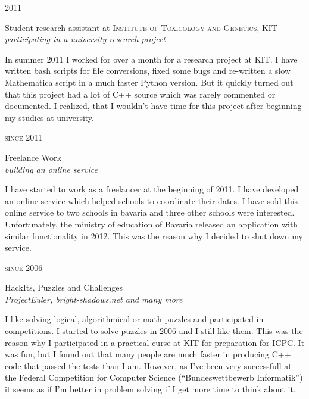 \documentclass[a4paper,10pt]{article} %
\begin{document}
{\begin{minipage}[t]{0.5\textwidth}
{\raggedleft\textsc{2011}\par}

{\raggedright\large Student research assistant at \textsc{ Institute of Toxicology and Genetics}, KIT\\
\textit{participating in a university research project}\\[5pt]}

\normalsize{In summer 2011 I worked for over a month for a
research project at KIT. I have written bash scripts for file
conversions, fixed some bugs and re-written a slow Mathematica script
in a much faster Python version. But it quickly turned out that
this project had a lot of C++ source which was rarely commented or
documented. I realized, that I wouldn't have time for this project
after beginning my studies at university.}\\


{\raggedleft\textsc{since 2011}\par}

{\raggedright\large Freelance Work\\
\textit{building an online service}\\[5pt]}

\normalsize{I have started to work as a freelancer at the beginning
of 2011. I have developed an online-service which helped
schools to coordinate their dates. I have sold this online service to
two schools in bavaria and three other schools were interested.
Unfortunately, the ministry of education of Bavaria
released an application with similar functionality in
2012. This was the reason why I decided to shut down my service.}\\

{\raggedleft\textsc{since 2006}\par}

{\raggedright\large HackIts, Puzzles and Challenges\\
\textit{ProjectEuler, bright-shadows.net and many more}\\[5pt]}

\normalsize{I like solving logical, algorithmical or math
puzzles and participated in competitions. I started to solve puzzles
in 2006 and I still like them. This was the reason why I participated
in a practical curse at KIT for preparation for ICPC. It was fun,
but I found out that many people are much faster in producing C++
code that passed the tests than I am.
However, as I've been very successfull at the Federal Competition for
Computer Science (``Bundeswettbewerb Informatik'') it seems as if I'm
better in problem solving if I get more time to think about it.}\\


\end{minipage}}
\end{document}
